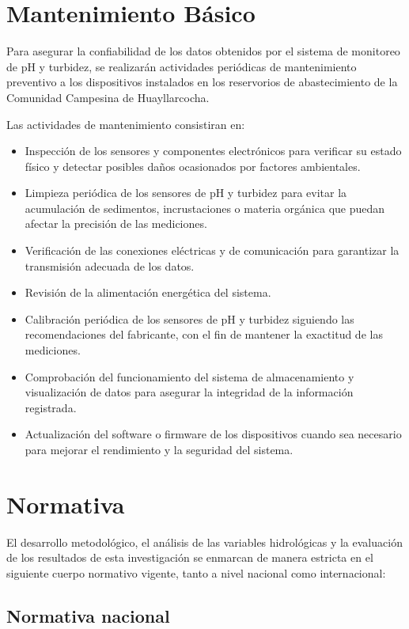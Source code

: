 \section{Mantenimiento Básico}

Para asegurar la confiabilidad de los datos obtenidos por el sistema de monitoreo de pH y turbidez, se realizarán actividades periódicas de mantenimiento preventivo a los dispositivos instalados en los reservorios de abastecimiento de la Comunidad Campesina de Huayllarcocha.

Las actividades de mantenimiento consistiran en:

\begin{itemize}
    \item Inspección  de los sensores y componentes electrónicos para verificar su estado físico y detectar posibles daños ocasionados por factores ambientales.
    \item Limpieza periódica de los sensores de pH y turbidez para evitar la acumulación de sedimentos, incrustaciones o materia orgánica que puedan afectar la precisión de las mediciones.
    \item Verificación de las conexiones eléctricas y de comunicación para garantizar la transmisión adecuada de los datos.
    \item Revisión de la alimentación energética del sistema.
    \item Calibración periódica de los sensores de pH y turbidez siguiendo las recomendaciones del fabricante, con el fin de mantener la exactitud de las mediciones.
    \item Comprobación del funcionamiento del sistema de almacenamiento y visualización de datos para asegurar la integridad de la información registrada.
    \item Actualización del software o firmware de los dispositivos cuando sea necesario para mejorar el rendimiento y la seguridad del sistema.
\end{itemize}

\section{Normativa}

El desarrollo metodológico, el análisis de las variables hidrológicas y la evaluación de los resultados de esta investigación se enmarcan de manera estricta en el siguiente cuerpo normativo vigente, tanto a nivel nacional como internacional:

\subsection{Normativa nacional}

